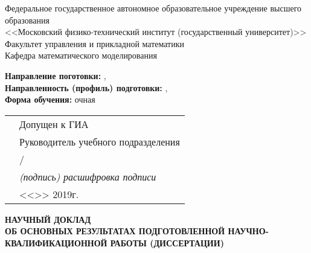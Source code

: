 \thispagestyle{empty}
\begin{center}
Федеральное государственное автономное образовательное учреждение высшего
образования \\
<<Московский физико-технический институт (государственный университет)>> \\
Факультет управления и прикладной математики \\
Кафедра математического моделирования \\
\end{center}

\vspace{0pt plus1fill}
\begin{small}
\begin{flushleft}
\textbf {Направление поготовки:} \thesisSpecialtyNumber, \thesisSpecialtyTitle \\
\textbf {Направленность (профиль) подготовки:} \thesisSpecialtyTwoNumber, \thesisSpecialtyTwoTitle \\
\textbf {Форма обучения:} очная
\end{flushleft}

\begin{flushright}
  \begin{tabularx}{\textwidth}{XX}
    &Допущен к ГИА \\
    &Руководитель учебного подразделения \\
    &\underline{\hspace{3cm}}/\underline{\hspace{4cm}} \\
    &\hspace{1cm}\textit {(подпись) расшифровка подписи} \\
    & <<\underline {\hspace{1cm}}>> \underline {\hspace{3cm}} 2019г.
  \end{tabularx}
\end{flushright}

\vspace{0pt plus3fill}
\begin{center}
\textbf {НАУЧНЫЙ ДОКЛАД} \\
\textbf {ОБ ОСНОВНЫХ РЕЗУЛЬТАТАХ ПОДГОТОВЛЕННОЙ НАУЧНО-КВАЛИФИКАЦИОННОЙ РАБОТЫ (ДИССЕРТАЦИИ)}

\vspace{0pt plus2fill}

\textbf {\thesisTitle}
\end{center}


\end{small}
